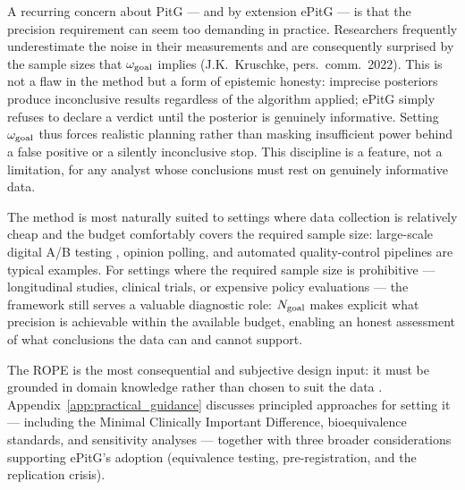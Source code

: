A recurring concern about PitG --- and by extension ePitG --- is that the precision
requirement can seem too demanding in practice.
Researchers frequently underestimate the noise in their measurements and are consequently surprised by the sample sizes that
$\omega_{\rm goal}$ implies (J.K.\ Kruschke, pers.\ comm.\ 2022). This is not a flaw
in the method but a form of epistemic honesty: imprecise posteriors produce inconclusive
results regardless of the algorithm applied; ePitG simply refuses to declare a verdict
until the posterior is genuinely informative. Setting $\omega_{\rm goal}$ thus forces
realistic planning rather than masking insufficient power behind a false positive or a
silently inconclusive stop.
This discipline is a feature, not a limitation, for any analyst whose conclusions
must rest on genuinely informative data.

The method is most naturally suited to settings where data collection is relatively
cheap and the budget comfortably covers the required sample size: large-scale digital
A/B testing \citep{johari2022}, opinion polling, and automated quality-control pipelines
are typical examples.
For settings where the required sample size is prohibitive --- longitudinal studies,
clinical trials, or expensive policy evaluations --- the framework still serves a
valuable diagnostic role: $N_{\rm goal}$ makes explicit what precision is achievable
within the available budget, enabling an honest assessment of what conclusions the data
can and cannot support.

The ROPE is the most consequential and subjective design input: it must be grounded
in domain knowledge rather than chosen to suit the data \citep{kruschke2018}.
Appendix~\ref{app:practical_guidance} discusses principled approaches for setting it
--- including the Minimal Clinically Important Difference, bioequivalence standards,
and sensitivity analyses --- together with three broader considerations supporting
ePitG's adoption (equivalence testing, pre-registration, and the replication crisis).

